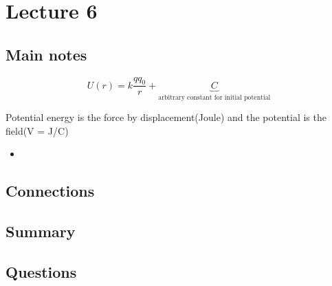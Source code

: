 \section{Lecture 6}
\subsection{Main notes}

\[
U(r) = k \frac{qq_0}{r} + \underbrace{C}_{\text{arbitrary constant for initial potential}}
  \]

  Potential energy is the force by displacement(Joule) and the potential is the field(V = J/C)


\begin{itemize}
	\item
\end{itemize}


\subsection{Connections}


\subsection{Summary}


\subsection{Questions}
